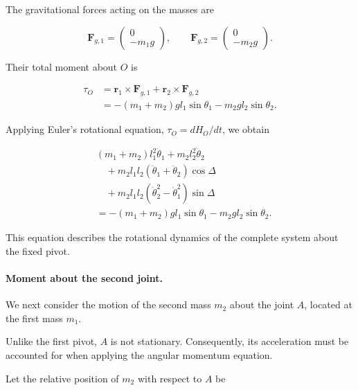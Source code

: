 The gravitational forces acting on the masses are

\begin{equation}
    \mathbf{F}_{g,1}=
    \begin{pmatrix}0\\-m_1g\end{pmatrix},
    \qquad
    \mathbf{F}_{g,2}=
    \begin{pmatrix}0\\-m_2g\end{pmatrix}.
\end{equation}

Their total moment about \(O\) is

\begin{align}
    \tau_O
    &=
    \mathbf{r}_1\times\mathbf{F}_{g,1}
    +\mathbf{r}_2\times\mathbf{F}_{g,2}\nonumber\\
    &=
    -(m_1+m_2)gl_1\sin\theta_1
    -m_2gl_2\sin\theta_2.
\end{align}

Applying Euler's rotational equation, \(\tau_O=dH_O/dt\), we obtain

\begin{align}
    &(m_1+m_2)l_1^2\ddot{\theta}_1
    +m_2l_2^2\ddot{\theta}_2 \nonumber\\
    &\quad
    +m_2l_1l_2
    (\ddot{\theta}_1+\ddot{\theta}_2)
    \cos\Delta \nonumber\\
    &\quad
    +m_2l_1l_2
    (\dot{\theta}_2^2-\dot{\theta}_1^2)
    \sin\Delta \nonumber\\
    &=
    -(m_1+m_2)gl_1\sin\theta_1
    -m_2gl_2\sin\theta_2.
    \label{eq:NE_joint1}
\end{align}

This equation describes the rotational dynamics of the complete system about the fixed pivot.

\paragraph{Moment about the second joint.}

We next consider the motion of the second mass \(m_2\) about the joint \(A\), located at the first mass \(m_1\).

Unlike the first pivot, \(A\) is not stationary. Consequently, its acceleration must be accounted for when applying the angular momentum equation.

Let the relative position of \(m_2\) with respect to \(A\) be

